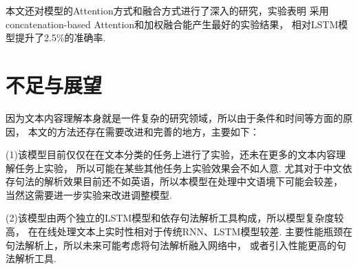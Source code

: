 \documentclass[bachelor,adobefonts]{jnuthesis}
\begin{document}
本文还对模型的Attention方式和融合方式进行了深入的研究，实验表明
采用concatenation-based Attention和加权融合能产生最好的实验结果，
相对LSTM模型提升了2.5\%的准确率.

\section{不足与展望}
因为文本内容理解本身就是一件复杂的研究领域，所以由于条件和时间等方面的原因，
本文的方法还存在需要改进和完善的地方，主要如下：

(1)该模型目前仅仅在在文本分类的任务上进行了实验，还未在更多的文本内容理解任务上实验，
所以可能在某些其他任务上实验效果会不如人意.
尤其对于中文依存句法的解析效果目前还不如英语，所以本模型在处理中文语境下可能会较差，
当然这需要进一步实验来改进调整模型.

(2)该模型由两个独立的LSTM模型和依存句法解析工具构成，所以模型复杂度较高，
在在线处理文本上实时性相对于传统RNN、LSTM模型较差.
主要性能瓶颈在句法解析上，所以未来可能考虑将句法解析融入网络中，
或者引入性能更高的句法解析工具.


\nocite{*}

%
%

\begin{acknowledgement}
  
\end{acknowledgement}

\backmatter




\end{document}

